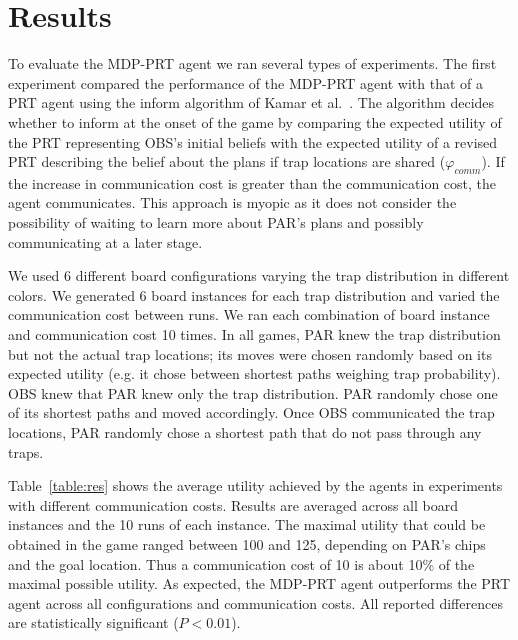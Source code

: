 \section{Results}
\label{sec:res}
To evaluate the MDP-PRT agent we ran several types of experiments. 
The first experiment compared the performance of the MDP-PRT agent with that of a PRT agent using the inform algorithm of Kamar et al.~. The algorithm decides whether to inform at the onset of the game by comparing the expected utility of the PRT representing OBS's initial beliefs with the expected utility of a revised PRT describing the belief about the plans if trap locations are shared ($\varphi_{comm}$). If the increase in communication cost is greater than the communication cost, the agent communicates. This approach is myopic as it does not consider the possibility of waiting to learn more about PAR's plans and possibly communicating at a later stage.

 We used 6 different board configurations varying the trap distribution in different colors. We generated 6 board instances for each trap distribution and varied the communication cost between runs. We ran each combination of board instance and communication cost 10 times.  In all games, PAR  knew the trap distribution but not the actual trap locations; its moves were chosen randomly based on its expected utility (e.g. it chose between shortest paths weighing trap probability).  OBS  knew that PAR knew only the trap distribution. PAR randomly chose one of its shortest paths and moved accordingly. Once  OBS  communicated the trap locations, PAR randomly chose a shortest path that do not pass through any traps.



Table~\ref{table:res} shows the average utility achieved by the agents in experiments with different communication costs. Results are averaged across all board instances and the 10 runs of each instance. The maximal utility that could be obtained in the game ranged between 100 and 125, depending on  PAR's chips and the goal location. Thus a communication cost of 10 is about 10\% of the maximal possible utility.  As expected, the MDP-PRT agent outperforms the PRT agent across all configurations and communication costs.  All reported differences are statistically significant ($P<0.01$).




